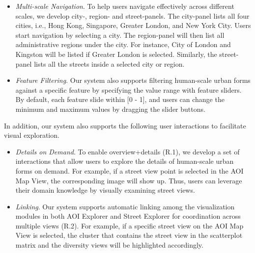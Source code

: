 
\begin{itemize}

\item
\textit{Multi-scale Navigation}.
To help users navigate effectively across different scales, we develop city-, region- and street-panels.
The city-panel lists all four cities, i.e., Hong Kong, Singapore, Greater London, and New York City.
Users start navigation by selecting a city. 
The region-panel will then list all administrative regions under the city.
For instance, City of London and Kingston will be listed if Greater London is selected.
Similarly, the street-panel lists all the streets inside a selected city or region.

\item
\textit{Feature Filtering}.
Our system also supports filtering human-scale urban forms against a specific feature by specifying the value range with feature sliders. 
By default, each feature slide within [0 - 1], and users can change the minimum and maximum values by dragging the slider buttons.

\end{itemize}

In addition, our system also supports the following user interactions to facilitate visual exploration.
\begin{itemize}

\item
\textit{Details on Demand}.
To enable overview+details (R.1), we develop a set of interactions that allow users to explore the details of human-scale urban forms on demand.
For example, if a street view point is selected in the AOI Map View, the corresponding image will show up.
Thus, users can leverage their domain knowledge by visually examining street views.

\vspace*{-1mm}
\item
\textit{Linking}.
Our system supports automatic linking among the visualization modules in both AOI Explorer and Street Explorer for coordination across multiple views (R.2).
For example, if a specific street view on the AOI Map View is selected, the cluster that contains the street view in the scatterplot matrix and the diversity views will be highlighted accordingly.

\end{itemize}